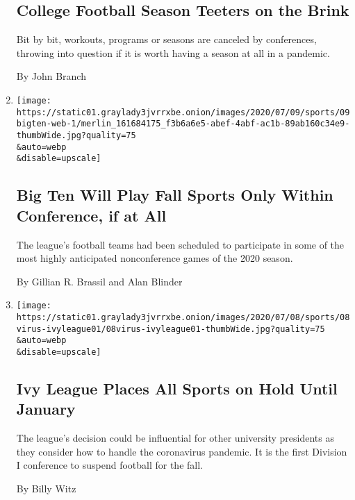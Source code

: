 \begin{enumerate}
  \hypertarget{college-football-season-teeters-on-the-brink}{%
  \subsection{College Football Season Teeters on the
  Brink}\label{college-football-season-teeters-on-the-brink}}

  Bit by bit, workouts, programs or seasons are canceled by conferences,
  throwing into question if it is worth having a season at all in a
  pandemic.

  By John Branch
\item
  \href{/2020/07/09/sports/ncaafootball/big-ten-fall-sports-in-conference.html}{}

  \texttt{[image: https://static01.graylady3jvrrxbe.onion/images/2020/07/09/sports/09bigten-web-1/merlin\_161684175\_f3b6a6e5-abef-4abf-ac1b-89ab160c34e9-thumbWide.jpg?quality=75\\\&auto=webp\\\&disable=upscale]}

  \hypertarget{big-ten-will-play-fall-sports-only-within-conference-if-at-all}{%
  \subsection{Big Ten Will Play Fall Sports Only Within Conference, if
  at
  All}\label{big-ten-will-play-fall-sports-only-within-conference-if-at-all}}

  The league's football teams had been scheduled to participate in some
  of the most highly anticipated nonconference games of the 2020 season.

  By Gillian R. Brassil and Alan Blinder
\item
  \href{/2020/07/08/sports/ncaafootball/ivy-league-fall-sports-football-coronavirus.html}{}

  \texttt{[image: https://static01.graylady3jvrrxbe.onion/images/2020/07/08/sports/08virus-ivyleague01/08virus-ivyleague01-thumbWide.jpg?quality=75\\\&auto=webp\\\&disable=upscale]}

  \hypertarget{ivy-league-places-all-sports-on-hold-until-january}{%
  \subsection{Ivy League Places All Sports on Hold Until
  January}\label{ivy-league-places-all-sports-on-hold-until-january}}

  The league's decision could be influential for other university
  presidents as they consider how to handle the coronavirus pandemic. It
  is the first Division I conference to suspend football for the fall.

  By Billy Witz
\end{enumerate}


